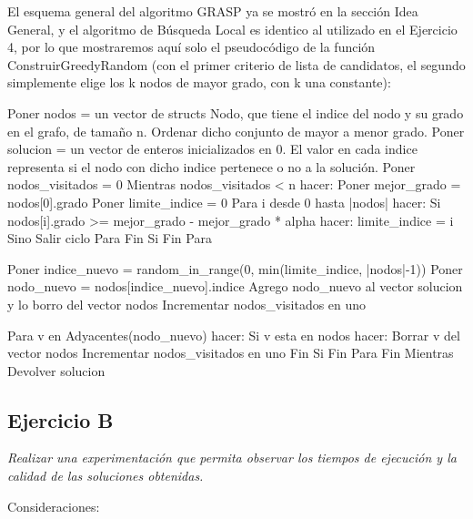 El esquema general del algoritmo GRASP ya se mostró en la sección Idea General, y el algoritmo de Búsqueda Local es identico al utilizado en el Ejercicio 4, por lo que mostraremos aquí solo el pseudocódigo de la función ConstruirGreedyRandom (con el primer criterio de lista de candidatos, el segundo simplemente elige los k nodos de mayor grado, con k una constante):

\begin{codesnippet}
Poner nodos = un vector de structs Nodo, que tiene el indice del nodo y su grado
    en el grafo, de tamaño n.
Ordenar dicho conjunto de mayor a menor grado.
Poner solucion = un vector de enteros inicializados en 0. El valor en cada indice
    representa si el nodo con dicho indice pertenece o no a la solución.
Poner nodos_visitados = 0
Mientras nodos_visitados < n hacer:
    Poner mejor_grado = nodos[0].grado
    Poner limite_indice = 0
    Para i desde 0 hasta |nodos| hacer:
        Si nodos[i].grado >= mejor_grado - mejor_grado * alpha hacer:
            limite_indice = i
        Sino
            Salir ciclo Para
        Fin Si
    Fin Para

    Poner indice_nuevo = random_in_range(0, min(limite_indice, |nodos|-1))
    Poner nodo_nuevo = nodos[indice_nuevo].indice
    Agrego nodo_nuevo al vector solucion y lo borro del vector nodos
    Incrementar nodos_visitados en uno

    Para v en Adyacentes(nodo_nuevo) hacer:
        Si v esta en nodos hacer:
            Borrar v del vector nodos
            Incrementar nodos_visitados en uno
        Fin Si
    Fin Para
Fin Mientras
Devolver solucion
\end{codesnippet}

\subsection{Ejercicio B}

\textit{Realizar una experimentación que permita observar los tiempos de ejecución y la calidad de las soluciones obtenidas.}

\medskip

Consideraciones:

